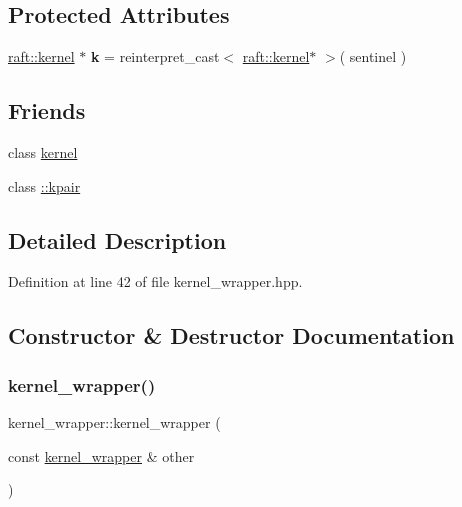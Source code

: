 \subsection*{Protected Attributes}
\begin{DoxyCompactItemize}
\item 
\hypertarget{classraft_1_1kernel__wrapper_af9ee0b682077cba73280fdd50386c669}{}\label{classraft_1_1kernel__wrapper_af9ee0b682077cba73280fdd50386c669} 
\hyperlink{classraft_1_1kernel}{raft\+::kernel} $\ast$ {\bfseries k} = reinterpret\+\_\+cast$<$ \hyperlink{classraft_1_1kernel}{raft\+::kernel}$\ast$ $>$( sentinel )
\end{DoxyCompactItemize}
\subsection*{Friends}
\begin{DoxyCompactItemize}
\item 
class \hyperlink{classraft_1_1kernel__wrapper_aaae51189d6e1e8b24b5654e3704ff50b}{kernel}
\item 
class \hyperlink{classraft_1_1kernel__wrapper_ae07b02dff85bd74c2d4d69d55bafe0a2}{\+::kpair}
\end{DoxyCompactItemize}


\subsection{Detailed Description}


Definition at line 42 of file kernel\+\_\+wrapper.\+hpp.



\subsection{Constructor \& Destructor Documentation}
\hypertarget{classraft_1_1kernel__wrapper_a4d8b3a7bb72e1c09bd0088e4b3751ea3}{}\label{classraft_1_1kernel__wrapper_a4d8b3a7bb72e1c09bd0088e4b3751ea3} 
\subsubsection{\texorpdfstring{kernel\+\_\+wrapper()}{kernel\_wrapper()}\hspace{0.1cm}{\footnotesize\ttfamily [1/2]}}
{\footnotesize\ttfamily kernel\+\_\+wrapper\+::kernel\+\_\+wrapper (\begin{DoxyParamCaption}\item[{const \hyperlink{classraft_1_1kernel__wrapper}{kernel\+\_\+wrapper} \&}]{other }\end{DoxyParamCaption})}

